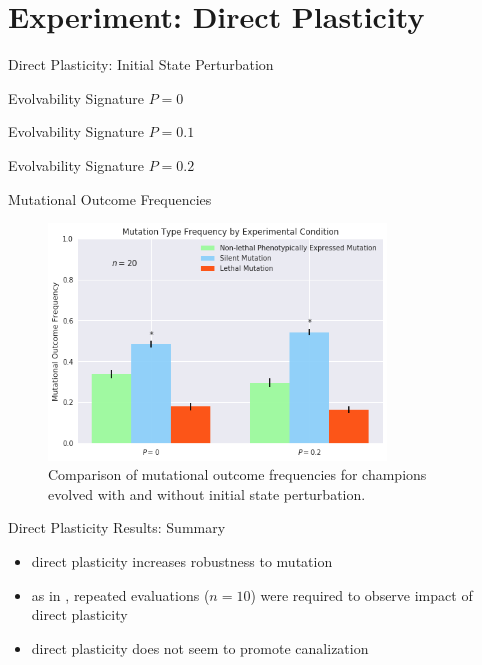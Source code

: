\section{Experiment: Direct Plasticity}


\begin{frame}{Direct Plasticity: Initial State Perturbation}

\end{frame}

\begin{frame}{Evolvability Signature $P=0$}

\end{frame}

\begin{frame}{Evolvability Signature $P=0.1$}

\end{frame}

\begin{frame}{Evolvability Signature $P=0.2$}

\end{frame}

\begin{frame}{Mutational Outcome Frequencies}
\begin{figure}
    \centering
    \includegraphics[width=0.8\textwidth]{img/mutation_type_direct}
 	\captionsetup{singlelinecheck=off,justification=raggedright}
  	\caption{Comparison of mutational outcome frequencies for champions evolved with and without initial state perturbation.}
    \label{fig:mutation_type_indirect}
\end{figure}
\end{frame}

\begin{frame}{Direct Plasticity Results: Summary}
\begin{itemize}
  \item direct plasticity increases robustness to mutation
  \item as in \cite{Reisinger2005TowardsEvolvability}, repeated evaluations ($n=10$) were required to observe impact of direct plasticity
  \item direct plasticity does not seem to promote canalization 
\end{itemize}
\end{frame}